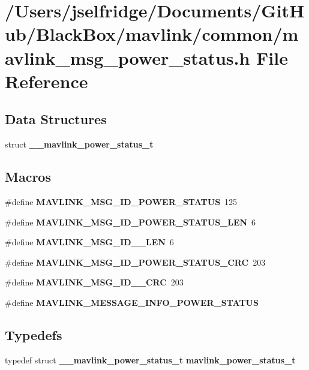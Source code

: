 \section{/\+Users/jselfridge/\+Documents/\+Git\+Hub/\+Black\+Box/mavlink/common/mavlink\+\_\+msg\+\_\+power\+\_\+status.h File Reference}
\label{mavlink__msg__power__status_8h}
\subsection*{Data Structures}
\begin{DoxyCompactItemize}
\item 
struct \textbf{ \+\_\+\+\_\+mavlink\+\_\+power\+\_\+status\+\_\+t}
\end{DoxyCompactItemize}
\subsection*{Macros}
\begin{DoxyCompactItemize}
\item 
\#define \textbf{ M\+A\+V\+L\+I\+N\+K\+\_\+\+M\+S\+G\+\_\+\+I\+D\+\_\+\+P\+O\+W\+E\+R\+\_\+\+S\+T\+A\+T\+US}~125
\item 
\#define \textbf{ M\+A\+V\+L\+I\+N\+K\+\_\+\+M\+S\+G\+\_\+\+I\+D\+\_\+\+P\+O\+W\+E\+R\+\_\+\+S\+T\+A\+T\+U\+S\+\_\+\+L\+EN}~6
\item 
\#define \textbf{ M\+A\+V\+L\+I\+N\+K\+\_\+\+M\+S\+G\+\_\+\+I\+D\+\_\+\_\+\+L\+EN}~6
\item 
\#define \textbf{ M\+A\+V\+L\+I\+N\+K\+\_\+\+M\+S\+G\+\_\+\+I\+D\+\_\+\+P\+O\+W\+E\+R\+\_\+\+S\+T\+A\+T\+U\+S\+\_\+\+C\+RC}~203
\item 
\#define \textbf{ M\+A\+V\+L\+I\+N\+K\+\_\+\+M\+S\+G\+\_\+\+I\+D\+\_\+\_\+\+C\+RC}~203
\item 
\#define \textbf{ M\+A\+V\+L\+I\+N\+K\+\_\+\+M\+E\+S\+S\+A\+G\+E\+\_\+\+I\+N\+F\+O\+\_\+\+P\+O\+W\+E\+R\+\_\+\+S\+T\+A\+T\+US}
\end{DoxyCompactItemize}
\subsection*{Typedefs}
\begin{DoxyCompactItemize}
\item 
typedef struct \textbf{ \+\_\+\+\_\+mavlink\+\_\+power\+\_\+status\+\_\+t} \textbf{ mavlink\+\_\+power\+\_\+status\+\_\+t}
\end{DoxyCompactItemize}



